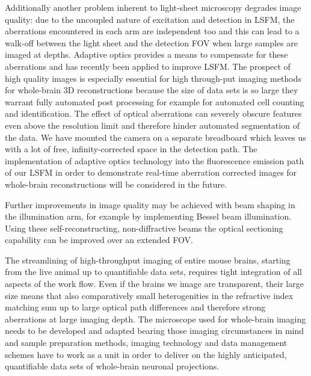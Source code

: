 \documentclass[12pt]{spieman}  %
\begin{document}
\begin{spacing}{2}
Additionally another problem inherent to light-sheet microscopy degrades image quality: due to the uncoupled nature of excitation and detection in LSFM, the aberrations encountered in each arm are independent too and this can lead to a walk-off between the light sheet and the detection FOV when large samples are imaged at depths. Adaptive optics\cite{Booth2007} provides a means to compensate for these aberrations and has recently been applied to improve LSFM\cite{Jorand2012}. The prospect of high quality images is especially essential for high through-put imaging methods for whole-brain 3D reconstructions because the size of data sets is so large they warrant fully automated post processing for example for automated cell counting and identification\cite{Frasconi2014}. The effect of optical aberrations can severely obscure features even above the resolution limit and therefore hinder automated segmentation of the data. We have mounted the camera on a separate breadboard which leaves us with a lot of free, infinity-corrected space in the detection path. The implementation of adaptive optics technology into the fluorescence emission path of our LSFM in order to demonstrate real-time aberration corrected images for whole-brain reconstructions will be considered in the future. 

Further improvements in image quality may be achieved with beam shaping in the illumination arm, for example by implementing Bessel beam illumination\cite{Fahrbach2010,Planchon2011,Gao2014}. Using these self-reconstructing, non-diffractive beams the optical sectioning capability can be improved over an extended FOV. 

The streamlining of high-throughput imaging of entire mouse brains, starting from the live animal up to quantifiable data sets, requires tight integration of all aspects of the work flow. Even if the brains we image are transparent, their large size means that also comparatively small heterogenities in the refractive index matching sum up to large optical path differences and therefore strong aberrations at large imaging depth. The microscope used for whole-brain imaging needs to be developed and adapted bearing those imaging circumstances in mind and sample preparation methods, imaging technology and data management schemes have to work as a unit in order to deliver on the highly anticipated, quantifiable data sets of whole-brain neuronal projections.


\end{spacing}
\end{document}
